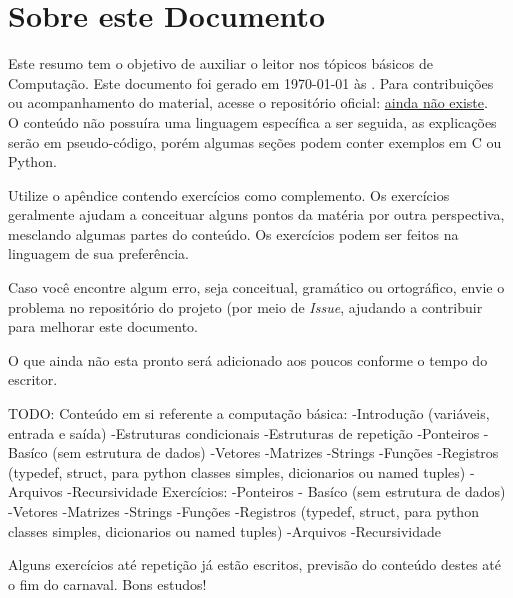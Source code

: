 \chapter*{Sobre este Documento}

Este resumo tem o objetivo de auxiliar o leitor nos tópicos básicos de Computação. Este documento foi gerado em \today{} às \currenttime. Para contribuições ou acompanhamento do material, acesse o repositório oficial: \url{ainda não existe}. \\

O conteúdo não possuíra uma linguagem específica a ser seguida, as explicações serão em pseudo-código, porém algumas seções podem conter exemplos em C ou Python.

Utilize o apêndice contendo exercícios como complemento. Os exercícios geralmente ajudam a conceituar alguns pontos da matéria por outra perspectiva, mesclando algumas partes do conteúdo. Os exercícios podem ser feitos na linguagem de sua preferência.

Caso você encontre algum erro, seja conceitual, gramático ou ortográfico, envie o problema no repositório do projeto (por meio de \textit{Issue}, ajudando a contribuir para melhorar este documento.

O que ainda não esta pronto será adicionado aos poucos conforme o tempo do escritor.

TODO:
    Conteúdo em si referente a computação básica:
        -Introdução (variáveis, entrada e saída)
        -Estruturas condicionais
        -Estruturas de repetição
        -Ponteiros - Basíco (sem estrutura de dados)
        -Vetores
        -Matrizes
        -Strings
        -Funções
        -Registros (typedef, struct, para python classes simples, dicionarios ou named tuples)
        -Arquivos
        -Recursividade
    Exercícios:
        -Ponteiros - Basíco (sem estrutura de dados)
        -Vetores
        -Matrizes
        -Strings
        -Funções
        -Registros (typedef, struct, para python classes simples, dicionarios ou named tuples)
        -Arquivos
        -Recursividade

Alguns exercícios até repetição já estão escritos, previsão do conteúdo destes até o fim do carnaval.
Bons estudos!
